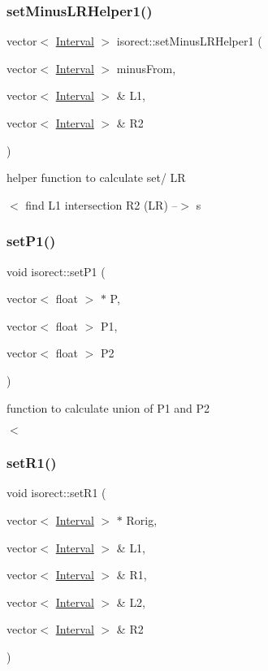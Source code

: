 \subsubsection{\texorpdfstring{set\+Minus\+L\+R\+Helper1()}{setMinusLRHelper1()}}
{\footnotesize\ttfamily vector$<$ \hyperlink{classInterval}{Interval} $>$ isorect\+::set\+Minus\+L\+R\+Helper1 (\begin{DoxyParamCaption}\item[{vector$<$ \hyperlink{classInterval}{Interval} $>$}]{minus\+From,  }\item[{vector$<$ \hyperlink{classInterval}{Interval} $>$ \&}]{L1,  }\item[{vector$<$ \hyperlink{classInterval}{Interval} $>$ \&}]{R2 }\end{DoxyParamCaption})}



helper function to calculate set/ LR 

$<$ find L1 intersection R2 (LR) --$>$ s \mbox{\label{classisorect_af3fb03a32b2c833d32ed610f0b260071}} 
\subsubsection{\texorpdfstring{set\+P1()}{setP1()}}
{\footnotesize\ttfamily void isorect\+::set\+P1 (\begin{DoxyParamCaption}\item[{vector$<$ float $>$ $\ast$}]{P,  }\item[{vector$<$ float $>$}]{P1,  }\item[{vector$<$ float $>$}]{P2 }\end{DoxyParamCaption})}



function to calculate union of P1 and P2 

$<$ \mbox{\label{classisorect_af829250d2d043fde4d8356cb68076823}} 
\subsubsection{\texorpdfstring{set\+R1()}{setR1()}}
{\footnotesize\ttfamily void isorect\+::set\+R1 (\begin{DoxyParamCaption}\item[{vector$<$ \hyperlink{classInterval}{Interval} $>$ $\ast$}]{Rorig,  }\item[{vector$<$ \hyperlink{classInterval}{Interval} $>$ \&}]{L1,  }\item[{vector$<$ \hyperlink{classInterval}{Interval} $>$ \&}]{R1,  }\item[{vector$<$ \hyperlink{classInterval}{Interval} $>$ \&}]{L2,  }\item[{vector$<$ \hyperlink{classInterval}{Interval} $>$ \&}]{R2 }\end{DoxyParamCaption})}



